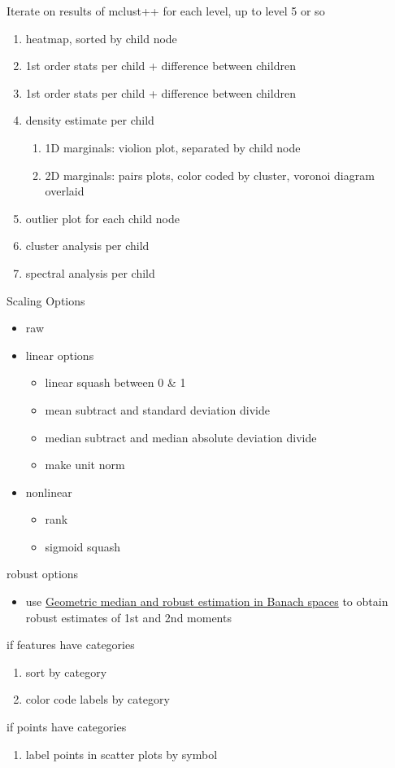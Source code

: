\documentclass[simplex.tex]{subfiles}
\begin{document}
\begin{spacing}{0.5}
{{\large Iterate on results of mclust++ for each level, up to level 5 or so}
\begin{enumerate}
  \item heatmap, sorted by child node
  \item 1st order stats per child + difference between children
  \item 1st order stats per child + difference between children
  \item density estimate per child
  \begin{enumerate}
    \item 1D marginals: violion plot, separated by child node
    \item 2D marginals: pairs plots, color coded by cluster, voronoi diagram overlaid
  \end{enumerate}
  \item outlier plot for each child node
  \item cluster analysis per child
  \item spectral analysis per child
\end{enumerate}

{\large Scaling Options}
\begin{itemize}
  \item raw
  \item linear options
  \begin{itemize}
    \item linear squash between 0 \& 1
    \item mean subtract and standard deviation divide
    \item median subtract and median absolute deviation divide
    \item make unit norm
  \end{itemize}
  \item nonlinear
  \begin{itemize}
    \item rank
    \item sigmoid squash
  \end{itemize}
\end{itemize}

{\large robust options}
\begin{itemize}
  \item use \href{http://projecteuclid.org/euclid.bj/1438777595}{Geometric median and robust estimation in Banach spaces} 
    to obtain robust estimates of 1st and 2nd moments
\end{itemize}

{\large if features have categories}
\begin{enumerate}
  \item sort by category
  \item color code labels by category
\end{enumerate}

{\large if points have categories}
\begin{enumerate}
  \item label points in scatter plots by symbol
\end{enumerate}
}
\end{spacing}
\end{document}
